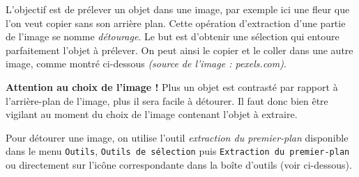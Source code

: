 L'objectif est de prélever un objet dans une image, par exemple ici une fleur que l'on veut copier sans son arrière plan. Cette opération d'extraction d'une partie de l'image se nomme \emph{détourage}. Le but est d'obtenir une sélection qui entoure parfaitement l'objet à prélever. On peut ainsi le copier et le coller dans une autre image, comme montré ci-dessous \emph{(source de l'image : pexels.com)}.



\textbf{Attention au choix de l'image !} Plus un objet est contrasté par rapport à l'arrière-plan de l'image, plus il sera facile à détourer. Il faut donc bien être vigilant au moment du choix de l'image contenant l'objet à extraire.

\vspace{6pt}

Pour détourer une image, on utilise l'outil \emph{extraction du premier-plan} disponible dans le menu \texttt{Outils}, \texttt{Outils de sélection} puis \texttt{Extraction du premier-plan} ou directement sur l'icône correspondante dans la boîte d'outils (voir ci-dessous).

